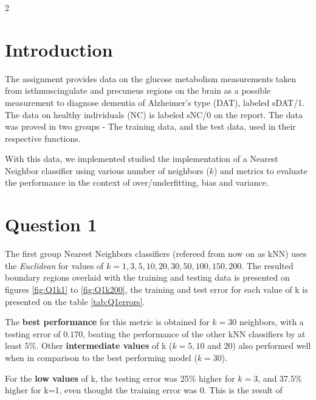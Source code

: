 
\begin{paracol}{2}
  \section*{Introduction}

  The assignment provides data on the glucose metabolism measurements
  taken from isthmuscingulate and precuneus regions on the brain as a possible
  measurement to diagnose dementia of Alzheimer's type (DAT), labeled sDAT/1.
  The data on healthy individuals (NC) is labeled sNC/0 on the report.
  The data was proved in two groups - The training data, and the test data,
  used in their respective functions.

  With this data, we implemented studied the implementation of a Nearest Neighbor classifier
  using various number of neighbors ($k$) and metrics to evaluate the performance in the context of
  over/underfitting, bias and variance.


  \section*{Question 1}

  The first group Nearest Neighbors classifiers (refereed from now on as kNN) uses the \textit{Euclidean}
  for values of $k={1,3,5,10,20,30,50,100,150,200}$. The resulted boundary regions overlaid with
  the training and testing data is presented on figures \ref{fig:Q1k1} to \ref{fig:Q1k200}, the training
  and test error for each value of k is presented on the table \ref{tab:Q1errors}.

  The \textbf{best performance} for this metric is obtained for $k=30$ neighbors, with a testing
  error of $0.170$, beating the performance of the other kNN classifiers by at least $5\%$.
  Other \textbf{intermediate values} of k ($k=5, 10$ and $20$) also
  performed well when in comparison to the best performing model ($k=30$).

  For the \textbf{low values} of k, the testing error was  25\% higher for $k=3$,
  and 37.5\% higher for k=1, even thought the training error was 0. This is the result of
  


\end{paracol}
